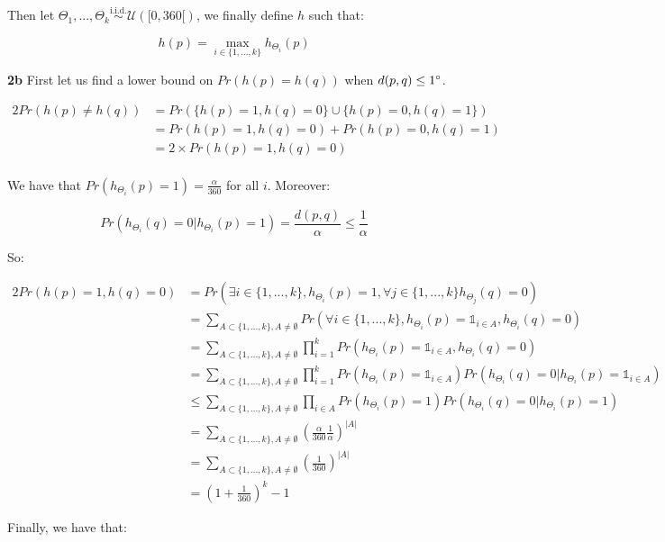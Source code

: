 \documentclass[10pt,a4paper]{article}
\theoremstyle{plain}
\begin{document}
Then let $\Theta_1, ..., \Theta_k \overset{\text{i.i.d.}}{\sim} \mathcal{U}([0, 360[)$, we finally define $h$ such that:

$$
h(p) = \underset{i \in \{1, ..., k\}}{\max}{h_{\Theta_i}(p)}
$$

\textbf{2b} First let us find a lower bound on $Pr(h(p) = h(q))$ when $d(p, q) \leq 1\degree$.

\begin{alignat*}{2}
Pr(h(p) \neq h(q)) & = Pr(\{h(p) = 1, h(q) = 0\} \cup \{h(p) = 0, h(q) = 1\}) \\
& = Pr(h(p) = 1, h(q) = 0) + Pr(h(p) = 0, h(q) = 1) \\
& = 2 \times Pr(h(p) = 1, h(q) = 0) \\
\end{alignat*}

We have that $Pr(h_{\Theta_i}(p) = 1) = \frac{\alpha}{360}$ for all $i$. Moreover:

$$
Pr(h_{\Theta_i}(q) = 0 | h_{\Theta_i}(p) = 1) = \frac{d(p, q)}{\alpha} \leq \frac{1}{\alpha}
$$

So:

\begin{alignat*}{2}
Pr(h(p) = 1, h(q) = 0) & = Pr(\exists i \in \{1, ..., k\}, h_{\Theta_i}(p) = 1, \forall j \in \{1, ..., k\} h_{\Theta_j}(q) = 0) \\
& = \sum_{A \subset \{1, ..., k\}, A \neq \emptyset}{Pr(\forall i \in \{1, ..., k\}, h_{\Theta_i}(p) = \mathds{1}_{i \in A}, h_{\Theta_i}(q) = 0)} \\
& = \sum_{A \subset \{1, ..., k\}, A \neq \emptyset}{\prod_{i = 1}^k{Pr(h_{\Theta_i}(p) = \mathds{1}_{i \in A}, h_{\Theta_i}(q) = 0)}} \\
& = \sum_{A \subset \{1, ..., k\}, A \neq \emptyset}{\prod_{i = 1}^k{Pr(h_{\Theta_i}(p) = \mathds{1}_{i \in A})Pr(h_{\Theta_i}(q) = 0 | h_{\Theta_i}(p) = \mathds{1}_{i \in A})}} \\
& \leq \sum_{A \subset \{1, ..., k\}, A \neq \emptyset}{\prod_{i \in A}{Pr(h_{\Theta_i}(p) = 1)Pr(h_{\Theta_i}(q) = 0 | h_{\Theta_i}(p) = 1)}} \\
& = \sum_{A \subset \{1, ..., k\}, A \neq \emptyset}{\left(\frac{\alpha}{360}\frac{1}{\alpha}\right)^{|A|}} \\
& = \sum_{A \subset \{1, ..., k\}, A \neq \emptyset}{\left(\frac{1}{360}\right)^{|A|}} \\
& = \left(1 + \frac{1}{360}\right)^k - 1
\end{alignat*}

Finally, we have that:
\end{document}
